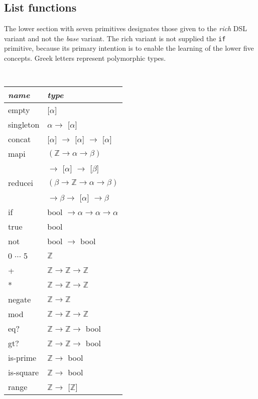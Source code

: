 \documentclass{article}
\begin{document}
\subsection{List functions}
The lower section with seven primitives designates those given to the
\emph{rich} DSL variant and not the \emph{base} variant. The rich variant is
not supplied the \texttt{if} primitive, because its primary intention is to
enable the learning of the lower five concepts.
Greek letters represent polymorphic types.
\begin{center}
\tt
\begin{tabular}{| l | l |}
  \hline
  \textrm{\emph{name}} & \textrm{\emph{type}} \\
  \hline
    empty & [$\alpha$] \\
    singleton & $\alpha \to$ [$\alpha$] \\
    concat & [$\alpha$] $\to$ [$\alpha$] $\to$ [$\alpha$] \\
    mapi & $(\mathbb{Z} \to \alpha \to \beta)$ \\
    & \qquad\qquad$\to$ [$\alpha$] $\to$ [$\beta$] \\
    reducei & $(\beta \to \mathbb{Z} \to \alpha \to \beta)$\\
    & \qquad\qquad$\to \beta \to$ [$\alpha$] $\to \beta$ \\
    \hline
    if & bool $\to \alpha \to \alpha \to \alpha$ \\
    \hline
    true & bool \\
    not & bool $\to$ bool \\
    0 $\cdots$ 5 & $\mathbb{Z}$ \\
    + & $\mathbb{Z} \to \mathbb{Z} \to \mathbb{Z}$ \\
    * & $\mathbb{Z} \to \mathbb{Z} \to \mathbb{Z}$ \\
    negate & $\mathbb{Z} \to \mathbb{Z}$ \\
    mod & $\mathbb{Z} \to \mathbb{Z} \to \mathbb{Z}$ \\
    eq? & $\mathbb{Z} \to \mathbb{Z} \to$ bool \\
    gt? & $\mathbb{Z} \to \mathbb{Z} \to$ bool \\
    is-prime & $\mathbb{Z} \to$ bool \\
    is-square & $\mathbb{Z} \to$ bool \\
    range & $\mathbb{Z} \to$ [$\mathbb{Z}$] \\

\end{tabular}
\end{center}
\end{document}
